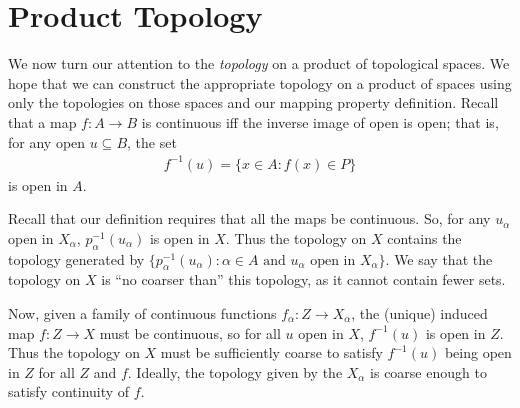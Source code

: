     \section{Product Topology}
      We now turn our attention to the \emph{topology} on a product of topological spaces.
      We hope that we can construct the appropriate topology on a product of spaces using only the topologies on those spaces and our mapping property definition.
      Recall that a map $f:A\rightarrow B$ is continuous iff the inverse image of open is open; that is, for any open $u\subseteq B$, the set
      \begin{align*}
        f^{-1}(u) = \{x\in A:f(x)\in P\}
      \end{align*}
      is open in $A$.

      Recall that our definition requires that all the maps be continuous.
      So, for any $u_\alpha$ open in $X_\alpha$, $p_\alpha^{-1}(u_\alpha)$ is open in $X$.
      Thus the topology on $X$ contains the topology generated by $\{p_\alpha^{-1}(u_\alpha):\alpha\in A\text{ and } u_\alpha\text{ open in }X_\alpha\}$.
      We say that the topology on $X$ is ``no coarser than'' this topology, as it cannot contain fewer sets.
      
      Now, given a family of continuous functions $f_\alpha:Z\rightarrow X_\alpha$, the (unique) induced map $f:Z\rightarrow X$ must be continuous, so for all $u$ open in $X$, $f^{-1}(u)$ is open in $Z$.
      Thus the topology on $X$ must be sufficiently coarse to satisfy $f^{-1}(u)$ being open in $Z$ for all $Z$ and $f$.
      Ideally, the topology given by the $X_\alpha$ is coarse enough to satisfy continuity of $f$.

